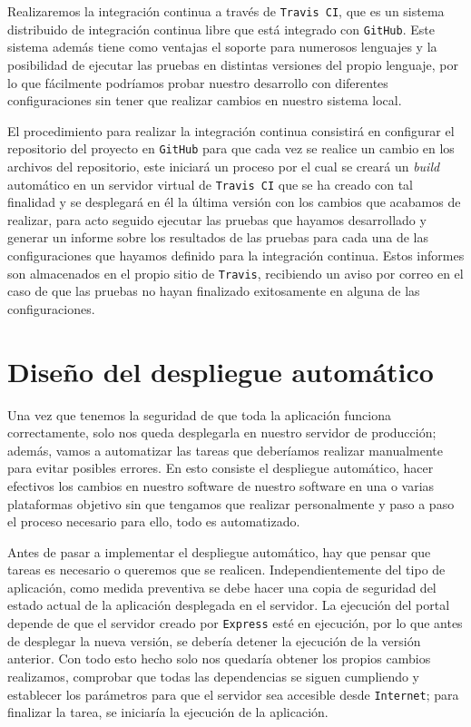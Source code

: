\bigskip
Realizaremos la integración continua a través de {\tt Travis CI}, que es un sistema distribuido de integración continua libre que está integrado con {\tt GitHub}. Este sistema además tiene como ventajas el soporte para numerosos lenguajes y la posibilidad de ejecutar las pruebas en distintas versiones del propio lenguaje, por lo que fácilmente podríamos probar nuestro desarrollo con diferentes configuraciones sin tener que realizar cambios en nuestro sistema local.

\bigskip
El procedimiento para realizar la integración continua consistirá en configurar el repositorio del proyecto en {\tt GitHub} para que cada vez se realice un cambio en los archivos del repositorio, este iniciará un proceso por el cual se creará un \textit{build} automático en un servidor virtual de {\tt Travis CI} que se ha creado con tal finalidad y se desplegará en él la última versión con los cambios que acabamos de realizar, para acto seguido ejecutar las pruebas que hayamos desarrollado y generar un informe sobre los resultados de las pruebas para cada una de las configuraciones que hayamos definido para la integración continua. Estos informes son almacenados en el propio sitio de {\tt Travis}, recibiendo un aviso por correo en el caso de que las pruebas no hayan finalizado exitosamente en alguna de las configuraciones.

\section{Diseño del despliegue automático}

Una vez que tenemos la seguridad de que toda la aplicación funciona correctamente, solo nos queda desplegarla en nuestro servidor de producción; además, vamos a automatizar las tareas que deberíamos realizar manualmente para evitar posibles errores. En esto consiste el despliegue automático, hacer efectivos los cambios en nuestro software de nuestro software en una o varias plataformas objetivo sin que tengamos que realizar personalmente y paso a paso el proceso necesario para ello, todo es 
automatizado.

\bigskip
Antes de pasar a implementar el despliegue automático, hay que pensar que tareas es necesario o queremos que se realicen. Independientemente del tipo de aplicación, como medida preventiva se debe hacer una copia de seguridad del estado actual de la aplicación desplegada en el servidor. La ejecución del portal depende de que el servidor creado por {\tt Express} esté en  ejecución, por lo que antes de desplegar la nueva versión, se debería detener la ejecución de la versión anterior. Con todo esto hecho solo nos quedaría obtener los propios cambios realizamos, comprobar que todas las dependencias se siguen cumpliendo y  establecer los parámetros para que el servidor sea accesible desde {\tt Internet}; para finalizar la tarea, se iniciaría la ejecución de la aplicación.

